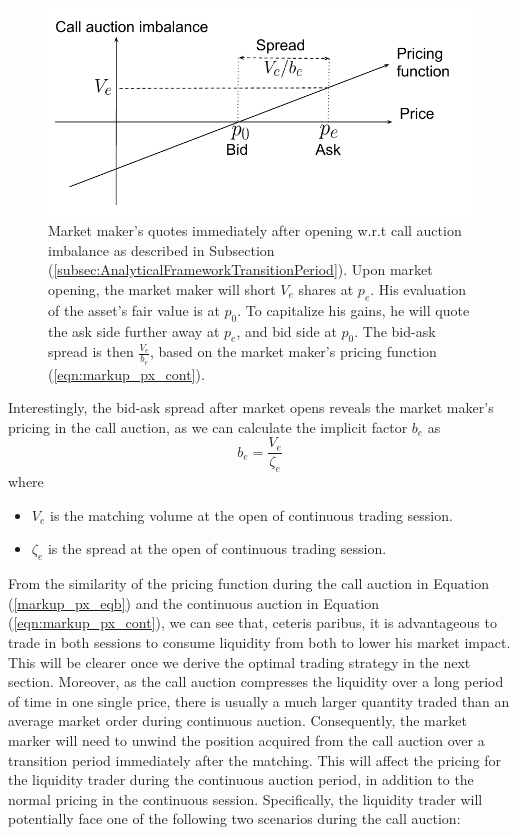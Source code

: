 \begin{figure}[h]
  \includegraphics[width=\textwidth]{images/MMPricingTransition}
  \caption{Market maker's quotes immediately after opening w.r.t call auction imbalance {\color{red} as described in Subsection (\ref{subsec:AnalyticalFrameworkTransitionPeriod})}. Upon market opening, the market maker will short $V_e$ shares at $p_e$. His evaluation of the asset's fair value is at $p_0$. {\color{red}To capitalize his gains}, he will quote the ask side further away at $p_e$, and bid side at $p_0$. The bid-ask spread is then $\frac{V_e}{b_e}$, based on the market maker's pricing function (\ref{eqn:markup_px_cont}).}
  \label{fig:mm_pricing_transition}
\end{figure}

Interestingly, the bid-ask spread after market opens reveals the market maker's pricing in the call
auction, as we can calculate the implicit factor $b_e$ as
\begin{equation}\label{eqn:expected_spread}
  b_e = \frac{V_e}{\zeta_e}
\end{equation}
where
\begin{itemize}
  \item $V_e$ is the matching volume at the open of continuous trading session.
  \item $\zeta_e$ is the spread at the open of continuous trading session.
\end{itemize}

From the similarity of the pricing function during the call auction in Equation (\ref{markup_px_eqb}) and the continuous auction in Equation (\ref{eqn:markup_px_cont}), we can see that, ceteris paribus, it is advantageous to trade in both sessions to consume liquidity from both to lower his market impact. This will be clearer once we derive the optimal trading strategy in the next section. Moreover, as the call auction compresses the liquidity over a long period of time in one single price, there is usually a much larger quantity traded than an average market order during continuous auction. Consequently, the market marker will need to unwind the position acquired from the call auction over a transition period immediately after the matching. This will affect the pricing for the liquidity trader during the continuous auction period, in addition to the normal pricing in the continuous session. Specifically, the liquidity trader will potentially face one of the following two scenarios during the call auction:


